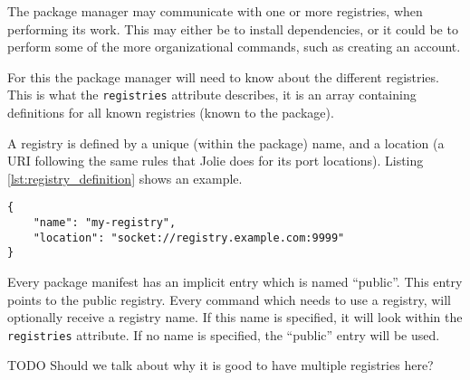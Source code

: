 The package manager may communicate with one or more registries, when
performing its work. This may either be to install dependencies, or it could be
to perform some of the more organizational commands, such as creating an
account.

For this the package manager will need to know about the different registries.
This is what the \texttt{registries} attribute describes, it is an
array containing definitions for all known registries (known to the package).

A registry is defined by a unique (within the package) name, and a location (a
URI following the same rules that Jolie does for its port locations). Listing
\ref{lst:registry_definition} shows an example.

\begin{listing}[H]

\begin{verbatim}
{
    "name": "my-registry",
    "location": "socket://registry.example.com:9999"
}
\end{verbatim}

\caption{A registry named \texttt{my-registry} being hosted at
    \texttt{registry.example.com} running on port 9999}

\label{lst:registry_definition}

\end{listing}

Every package manifest has an implicit entry which is named ``public''. This
entry points to the public registry. Every command which needs to use a
registry, will optionally receive a registry name. If this name is specified,
it will look within the \texttt{registries} attribute. If no name is
specified, the ``public'' entry will be used.

TODO Should we talk about why it is good to have multiple registries here?
